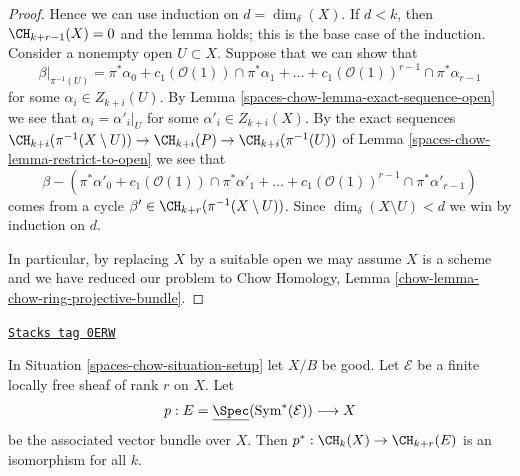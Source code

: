 \begin{proof}
\medskip\noindent
Hence we can use induction on $d = \dim_\delta(X)$.
If $d < k$, then $\CH_{k + r - 1}(X) = 0$ and the lemma holds;
this is the base case of the induction.
Consider a nonempty open $U \subset X$.
Suppose that we can show that
$$
\beta|_{\pi^{-1}(U)} =
\pi^*\alpha_0 +
c_1(\mathcal{O}(1)) \cap \pi^*\alpha_1 +
\ldots +
c_1(\mathcal{O}(1))^{r - 1} \cap \pi^*\alpha_{r - 1}
$$
for some $\alpha_i \in Z_{k + i}(U)$.
By Lemma \ref{spaces-chow-lemma-exact-sequence-open} we see that
$\alpha_i = \alpha'_i|_U$ for some $\alpha'_i \in Z_{k + i}(X)$.
By the exact sequences
$\CH_{k + i}(\pi^{-1}(X \setminus U)) \to \CH_{k + i}(P) \to
\CH_{k + i}(\pi^{-1}(U))$
of Lemma \ref{spaces-chow-lemma-restrict-to-open}
we see that
$$
\beta -
\left(\pi^*\alpha'_0 +
c_1(\mathcal{O}(1)) \cap \pi^*\alpha'_1 +
\ldots +
c_1(\mathcal{O}(1))^{r - 1} \cap \pi^*\alpha'_{r - 1}\right)
$$
comes from a cycle $\beta' \in \CH_{k + r}(\pi^{-1}(X \setminus U))$.
Since $\dim_\delta(X \setminus U) < d$ we win by
induction on $d$.

\medskip\noindent
In particular, by replacing $X$ by a suitable open we may assume
$X$ is a scheme and we have reduced our problem to
Chow Homology, Lemma \ref{chow-lemma-chow-ring-projective-bundle}.
\end{proof}

\begin{lemma}[Vectorbundle]
\label{spaces-chow-lemma-vectorbundle}
\href{https://stacks.math.columbia.edu/tag/0ERW}{\texttt{Stacks tag 0ERW}}

In Situation \ref{spaces-chow-situation-setup} let $X/B$ be good.
Let $\mathcal{E}$ be a finite locally free sheaf of rank $r$ on $X$.
Let
$$
p :
E = \underline{\Spec}(\text{Sym}^*(\mathcal{E}))
\longrightarrow
X
$$
be the associated vector bundle over $X$.
Then $p^* : \CH_k(X) \to \CH_{k + r}(E)$ is an isomorphism for all $k$.
\end{lemma}

